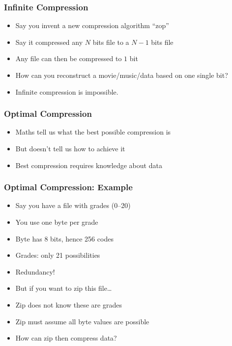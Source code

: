 \begin{frame}
  \frametitle{Infinite Compression}
  \begin{itemize}
    \item Say you invent a new compression algorithm ``zop''
    \item Say it compressed any $N$ bits file to a $N-1$ bits file
    \item Any file can then be compressed to $1$ bit
    \item How can you reconstruct a movie/music/data based on one single bit?
  \end{itemize}
  \begin{center}
  \end{center}
  \begin{itemize}
    \item Infinite compression is impossible.
  \end{itemize}
\end{frame}

\begin{frame}
  \frametitle{Optimal Compression}
  \begin{itemize}
    \item Maths tell us what the best possible compression is
    \item But doesn't tell us how to achieve it
    \item Best compression requires knowledge about data
  \end{itemize}
\end{frame}

\begin{frame}
  \frametitle{Optimal Compression: Example}
  \begin{itemize}
    \item Say you have a file with grades (0--20)
    \item You use one byte per grade
    \item Byte has 8 bits, hence 256 codes
    \item Grades: only 21 possibilities
    \item Redundancy!
    \item But if you want to zip this file\dots
    \item Zip does not know these are grades
    \item Zip must assume all byte values are possible
    \item How can zip then compress data?
  \end{itemize}
\end{frame}

